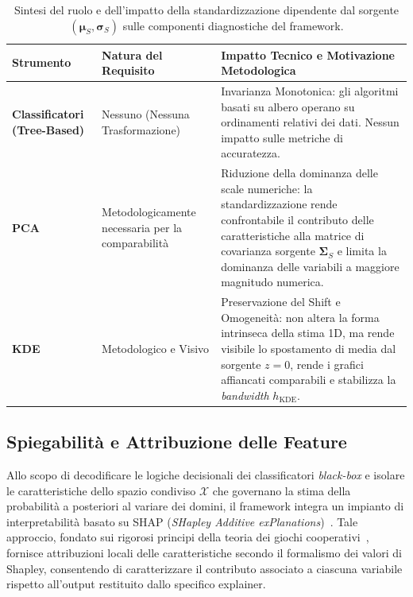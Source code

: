 \begin{table}[H]
    \centering
    \small
    \caption{Sintesi del ruolo e dell'impatto della standardizzazione dipendente dal sorgente $(\boldsymbol{\mu}_S, \boldsymbol{\sigma}_S)$ sulle componenti diagnostiche del framework.}
    \label{tab:confronto_scaling_pca_kde}
    \begin{tabularx}{\textwidth}{>{\raggedright\arraybackslash}p{2.5cm} >{\raggedright\arraybackslash}p{4cm} >{\raggedright\arraybackslash}X }
        \toprule
        \textbf{Strumento}  & \textbf{Natura del Requisito} & \textbf{Impatto Tecnico e Motivazione Metodologica} \\
        \midrule
        \textbf{Classificatori (Tree-Based)} &
        Nessuno (Nessuna Trasformazione) &
        Invarianza Monotonica: gli algoritmi basati su albero operano su ordinamenti relativi dei dati. Nessun impatto sulle metriche di accuratezza. \\
        \addlinespace
        \textbf{PCA} &
        Metodologicamente necessaria per la comparabilità &
        Riduzione della dominanza delle scale numeriche: la standardizzazione rende confrontabile il contributo delle caratteristiche alla matrice di covarianza sorgente $\boldsymbol{\Sigma}_S$ e limita la dominanza delle variabili a maggiore magnitudo numerica. \\
        \addlinespace
        \textbf{KDE} &
        Metodologico e Visivo &
        Preservazione del Shift e Omogeneità: non altera la forma intrinseca della stima 1D, ma rende visibile lo spostamento di media dal sorgente $z=0$, rende i grafici affiancati comparabili e stabilizza la \textit{bandwidth} $h_{\text{KDE}}$. \\
        \bottomrule
    \end{tabularx}
\end{table}

\subsection{Spiegabilità e Attribuzione delle Feature}
\label{subsec:spiegabilita_shap}

Allo scopo di decodificare le logiche decisionali dei classificatori \textit{black-box} e isolare le caratteristiche dello spazio condiviso $\mathcal{X}$ che governano la stima della probabilità a posteriori al variare dei domini, il framework integra un impianto di interpretabilità basato su SHAP (\textit{SHapley Additive exPlanations})~\cite{lundberg2017}. Tale approccio, fondato sui rigorosi principi della teoria dei giochi cooperativi~\cite{shapley1953}, fornisce attribuzioni locali delle caratteristiche secondo il formalismo dei valori di Shapley, consentendo di caratterizzare il contributo associato a ciascuna variabile rispetto all'output restituito dallo specifico explainer.

